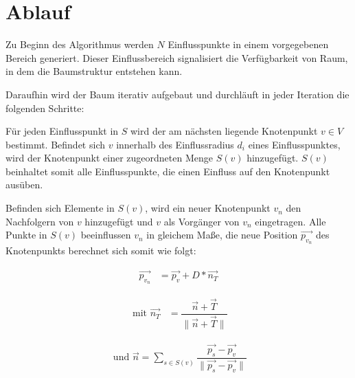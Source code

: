 \section{Ablauf}
\label{sec:SCA_Ablauf}
Zu Beginn des Algorithmus werden $N$ Einflusspunkte in einem vorgegebenen Bereich generiert. Dieser Einflussbereich signalisiert die Verfügbarkeit von Raum, in dem die Baumstruktur entstehen kann.  \cite[Abschn. 2]{SpaceColonizationAlgorithm:07}

Daraufhin wird der Baum iterativ aufgebaut und durchläuft in jeder Iteration die folgenden Schritte: 

\begin{description}[labelindent]
	\item[\boldmath$1.$] Für jeden Einflusspunkt in $S$ wird der am nächsten liegende Knotenpunkt $v\in V$ bestimmt. Befindet sich $v$ innerhalb des Einflussradius $d_i$ eines Einflusspunktes, wird der Knotenpunkt einer zugeordneten Menge $S(v)$ hinzugefügt. $S(v)$ beinhaltet somit alle Einflusspunkte, die einen Einfluss auf den Knotenpunkt ausüben. \cite[Abschn. 2]{SpaceColonizationAlgorithm:07} \label{alg:SCA_1}\\
	
	\item[\boldmath$2.$] Befinden sich Elemente in $S(v)$, wird ein neuer Knotenpunkt $v_n$ den Nachfolgern von $v$ hinzugefügt und $v$ als Vorgänger von $v_n$ eingetragen.  Alle Punkte in $S(v)$ beeinflussen $v_n$ in gleichem Maße, die neue Position $\overrightarrow{p_{v_n}}$ des Knotenpunkts berechnet sich somit wie folgt:
	
	\begin{equation}
	\begin{array}{ll}
	\overrightarrow{p_{v_n}} & = \overrightarrow{p_v} + D * \overrightarrow{n_{T}}
	\end{array}
	\end{equation} 
	
	\begin{equation}
	\begin{array}{ll}
	\text{  mit  } \overrightarrow{n_{T}} & = \dfrac{\overrightarrow{n} + \overrightarrow{T} }{\lVert\overrightarrow{n} + \overrightarrow{T}\rVert}  
	\end{array}
	\end{equation} 
	
	\begin{equation}
	\begin{array}{ll}
	\text{ und }  \overrightarrow{n} = \sum\limits_{s \in S(v)}\dfrac{\overrightarrow{p_s} - \overrightarrow{p_v}}{\lVert \overrightarrow{p_s} - \overrightarrow{p_v} \rVert}
	\end{array}
	\end{equation}	
	\cite[Abschn. 2]{SpaceColonizationAlgorithm:07} \label{alg:SCA_2}\\
	

\end{description}
